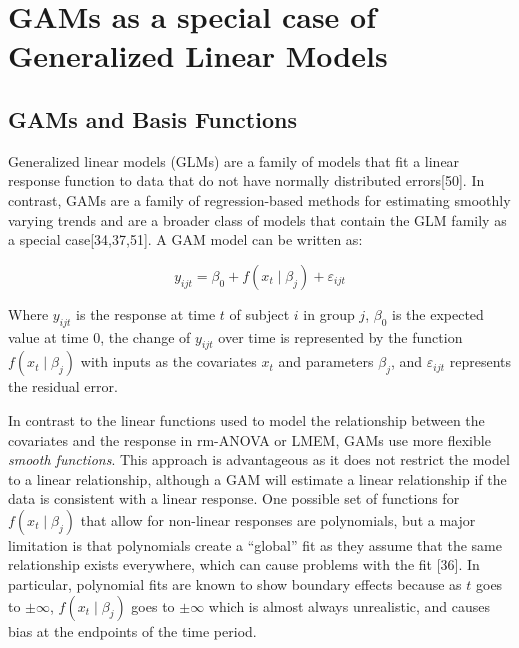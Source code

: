 \documentclass[
]{article}
\begin{document}
\hypertarget{gams-as-a-special-case-of-generalized-linear-models}{%
\section{GAMs as a special case of Generalized Linear Models}\label{gams-as-a-special-case-of-generalized-linear-models}}

\hypertarget{gams-and-basis-functions}{%
\subsection{GAMs and Basis Functions}\label{gams-and-basis-functions}}

Generalized linear models (GLMs) are a family of models that fit a linear response function to data that do not have normally distributed errors{[}50{]}. In contrast, GAMs are a family of regression-based methods for estimating smoothly varying trends and are a broader class of models that contain the GLM family as a special case{[}34,37,51{]}. A GAM model can be written as:

\begin{equation}
  y_{ijt}=\beta_0+f(x_t\mid \beta_j)+\varepsilon_{ijt}
  \label{eq:GAM}
\end{equation}

Where \(y_{ijt}\) is the response at time \(t\) of subject \(i\) in group \(j\), \(\beta_0\) is the expected value at time 0, the change of \(y_{ijt}\) over time is represented by the function \(f(x_t\mid \beta_j)\) with inputs as the covariates \(x_t\) and parameters \(\beta_j\), and \(\varepsilon_{ijt}\) represents the residual error.

In contrast to the linear functions used to model the relationship between the covariates and the response in rm-ANOVA or LMEM, GAMs use more flexible \emph{smooth functions}. This approach is advantageous as it does not restrict the model to a linear relationship, although a GAM will estimate a linear relationship if the data is consistent with a linear response. One possible set of functions for \(f(x_t\mid \beta_j)\) that allow for non-linear responses are polynomials, but a major limitation is that polynomials create a ``global'' fit as they assume that the same relationship exists everywhere, which can cause problems with the fit {[}36{]}. In particular, polynomial fits are known to show boundary effects because as \(t\) goes to \(\pm \infty\), \(f(x_t \mid \beta_j)\) goes to \(\pm \infty\) which is almost always unrealistic, and causes bias at the endpoints of the time period.
\end{document}

